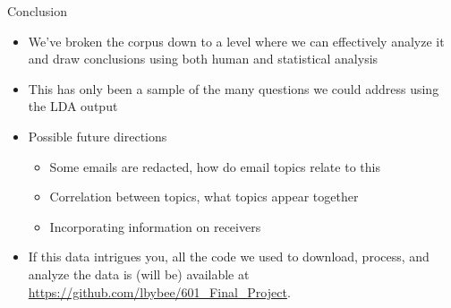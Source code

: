 \documentclass[handout,13pt]{beamer}
\begin{document}
\begin{frame}{Conclusion}
\begin{itemize}
\item We've broken the corpus down to a level where we can effectively analyze it and draw conclusions using both human and statistical analysis
\item This has only been a sample of the many questions we could address using the LDA output
\item Possible future directions
  \begin{itemize}
  \item Some emails are redacted, how do email topics relate to this
  \item Correlation between topics, what topics appear together
  \item Incorporating information on receivers
  \end{itemize}
\item If this data intrigues you, all the code we used to download, process, and analyze the data is (will be) available at \url{https://github.com/lbybee/601_Final_Project}.
\end{itemize}
\end{frame}
\end{document}
